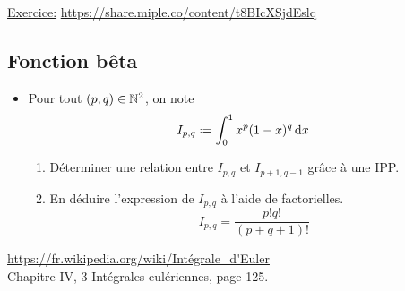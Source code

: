 \underline{Exercice:} \url{https://share.miple.co/content/t8BIcXSjdEslq}

\subsection{Fonction bêta}
\begin{itemize}
    \item Pour tout $(p,q) \in \mathbb{N}^2$, on note 
    $$I_{p,q} \defeq \int_{0}^{1} x^p (1-x)^q \d x$$
    \begin{enumerate}
        \item Déterminer une relation entre $I_{p,q}$ et $I_{p+1, q-1}$ grâce à une IPP.
        \item En déduire l'expression de $I_{p,q}$ à l'aide de factorielles.
        $$\boxed{I_{p,q} = \frac{p! q!}{(p + q + 1)!}}$$
    \end{enumerate}
\end{itemize}
\url{https://fr.wikipedia.org/wiki/Intégrale_d'Euler} \\
\cite{calcul_infinitesimal} Chapitre IV, 3 Intégrales eulériennes, page 125.
